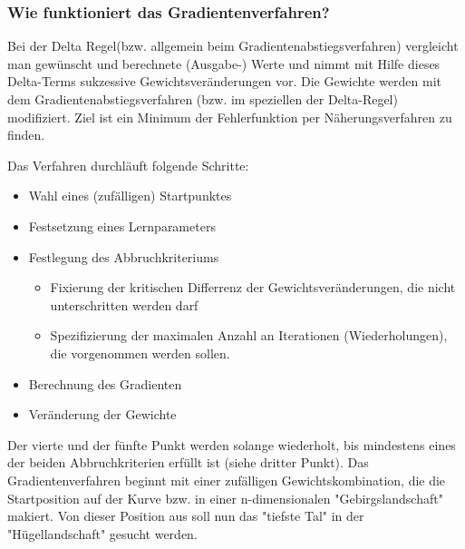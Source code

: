 \subsubsection{Wie funktioniert das Gradientenverfahren?}\label{subsec:gradientenverfahren:wie_funktioniert}
  Bei der Delta Regel(bzw. allgemein beim Gradientenabstiegsverfahren) vergleicht man gewünscht und berechnete (Ausgabe-) Werte und nimmt mit Hilfe dieses Delta-Terms sukzessive
  Gewichtsveränderungen vor. Die Gewichte werden mit dem Gradientenabstiegsverfahren (bzw. im speziellen der Delta-Regel) modifiziert. Ziel ist ein Minimum der Fehlerfunktion per Näherungsverfahren zu finden.

  Das Verfahren durchläuft folgende Schritte:
  \begin{itemize}
    \item Wahl eines (zufälligen) Startpunktes
  \end{itemize}
  \begin{itemize}
    \item Festsetzung eines Lernparameters
  \end{itemize}
  \begin{itemize}
    \item Festlegung des Abbruchkriteriums
    \begin{itemize}
    \item Fixierung der kritischen Differrenz der Gewichtsveränderungen, die nicht unterschritten werden darf
    \item Spezifizierung der maximalen Anzahl an Iterationen (Wiederholungen), die vorgenommen werden sollen.
    \end{itemize}
  \end{itemize}
  \begin{itemize}
    \item  Berechnung des Gradienten
  \end{itemize}
  \begin{itemize}
    \item Veränderung der Gewichte
  \end{itemize}

  Der vierte und der fünfte Punkt werden solange wiederholt, bis mindestens eines der beiden Abbruchkriterien erfüllt ist (siehe dritter Punkt).
  Das Gradientenverfahren beginnt mit einer zufälligen Gewichtskombination, die die Startposition auf der Kurve bzw. in einer n-dimensionalen "Gebirgslandschaft" makiert.
  Von dieser Position aus soll nun das "tiefste Tal" in der "Hügellandschaft" gesucht werden.\cite{GR10}
  


